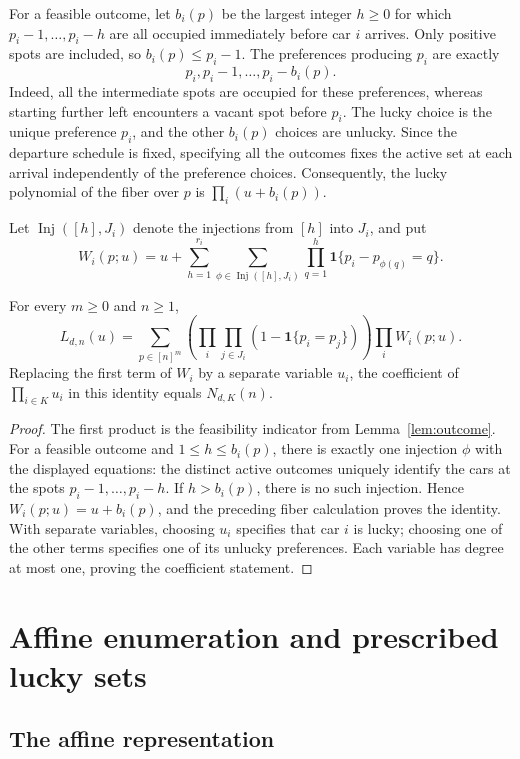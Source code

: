 \documentclass[11pt,a4paper]{article}
\newcommand{\ind}{\mathbf1}\newcommand{\spn}{\operatorname{span}}\newcommand{\MPF}{\operatorname{MPF}}\newcommand{\mpf}{\operatorname{mpf}}\newcommand{\Inj}{\operatorname{Inj}}
\begin{document}
For a feasible outcome, let $b_i(p)$ be the largest integer $h\ge0$ for
which $p_i-1,\ldots,p_i-h$ are all occupied immediately before car $i$
arrives.  Only positive spots are included, so $b_i(p)\le p_i-1$.
The preferences producing $p_i$ are exactly
\[
 p_i,p_i-1,\ldots,p_i-b_i(p).
\]
Indeed, all the intermediate spots are occupied for these preferences,
whereas starting further left encounters a vacant spot before $p_i$.
The lucky choice is the unique preference $p_i$, and the other $b_i(p)$
choices are unlucky.  Since the departure schedule is fixed, specifying all
the outcomes fixes the active set at each arrival independently of the
preference choices.  Consequently, the lucky polynomial of the fiber over
$p$ is $\prod_i(u+b_i(p))$.

Let $\Inj([h],J_i)$ denote the injections from $[h]$ into $J_i$, and put
\[
 W_i(p;u)=u+\sum_{h=1}^{r_i}\sum_{\phi\in\Inj([h],J_i)}
             \prod_{q=1}^h\ind\{p_i-p_{\phi(q)}=q\}.
\]
\begin{lemma}\label{lem:fiber}
For every $m\ge0$ and $n\ge1$,
\[
 L_{d,n}(u)=\sum_{p\in[n]^m}
    \left(\prod_i\prod_{j\in J_i}(1-\ind\{p_i=p_j\})\right)
    \prod_iW_i(p;u).
\]
Replacing the first term of $W_i$ by a separate variable $u_i$, the coefficient
of $\prod_{i\in K}u_i$ in this identity equals $N_{d,K}(n)$.
\end{lemma}
\begin{proof}
The first product is the feasibility indicator from
Lemma~\ref{lem:outcome}.  For a feasible outcome and $1\le h\le b_i(p)$,
there is exactly one injection $\phi$ with the displayed equations: the
distinct active outcomes uniquely identify the cars at the spots
$p_i-1,\ldots,p_i-h$.  If $h>b_i(p)$, there is no such injection.  Hence
$W_i(p;u)=u+b_i(p)$, and the preceding fiber calculation proves the identity.
With separate variables, choosing $u_i$ specifies that car $i$ is lucky;
choosing one of the other terms specifies one of its unlucky preferences.
Each variable has degree at most one, proving the coefficient statement.
\end{proof}

\section{Affine enumeration and prescribed lucky sets}\label{sec:exact}
\subsection{The affine representation}
\end{document}
